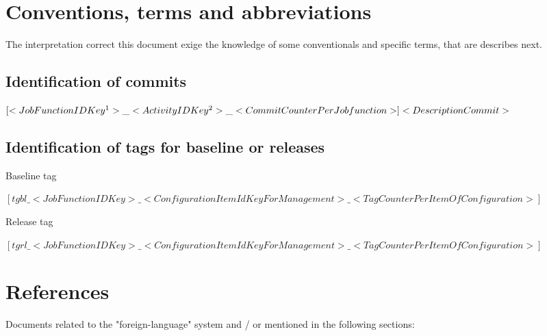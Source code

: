 \documentclass[11pt, twoside, a4paper]{book}
\begin{document}
            \section{Conventions, terms and abbreviations}
                
                The interpretation correct this document exige the knowledge of some conventionals and specific terms, that are describes next.	                
                
                \subsection{Identification of commits}
                	
                	\begin{center}
                		$[<Job Function ID Key\footnote{See section 2.2 for more details}>\_<Activity ID Key\footnote{See section 2.1 for more details}>\_<Commit Counter Per Job function>] <Description Commit>$
                	\end{center}
                
                \subsection{Identification of tags for baseline or releases}

					\begin{center}
						Baseline tag													

            			$[tgbl\_<Job Function ID Key>\_<Configuration Item Id Key For Management>\_<Tag Counter Per Item Of Configuration>]$
					\end{center}					                			

        			\begin{center}
		   				Release tag					        			
        			
            			$[tgrl\_<Job Function ID Key>\_<Configuration Item Id Key For Management>\_<Tag Counter Per Item Of Configuration>]$	
					\end{center}					                
					
            \section{References}
                    
                    Documents related to the "foreign-language" system and / or mentioned in the following sections:
            
\end{document}
